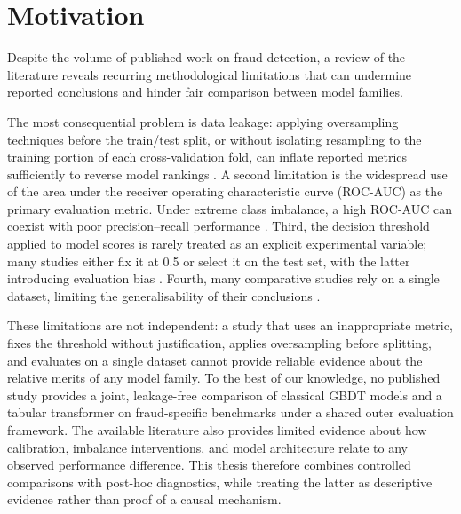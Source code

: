 \section{Motivation}
\label{subsec:motivation}

Despite the volume of published work on fraud detection, a review of the literature reveals recurring methodological limitations that can undermine reported conclusions and hinder fair comparison between model families.

The most consequential problem is data leakage: applying oversampling techniques before the train/test split, or without isolating resampling to the training portion of each cross-validation fold, can inflate reported metrics sufficiently to reverse model rankings \cite{hayat2025leakage}. A second limitation is the widespread use of the area under the receiver operating characteristic curve (ROC-AUC) as the primary evaluation metric. Under extreme class imbalance, a high ROC-AUC can coexist with poor precision--recall performance \cite{saito2015precision}. Third, the decision threshold applied to model scores is rarely treated as an explicit experimental variable; many studies either fix it at 0.5 or select it on the test set, with the latter introducing evaluation bias \cite{luzio2024decoupling}. Fourth, many comparative studies rely on a single dataset, limiting the generalisability of their conclusions \cite{dalpozzolo2017realistic}.

These limitations are not independent: a study that uses an inappropriate metric, fixes the threshold without justification, applies oversampling before splitting, and evaluates on a single dataset cannot provide reliable evidence about the relative merits of any model family. To the best of our knowledge, no published study provides a joint, leakage-free comparison of classical GBDT models and a tabular transformer on fraud-specific benchmarks under a shared outer evaluation framework. The available literature also provides limited evidence about how calibration, imbalance interventions, and model architecture relate to any observed performance difference. This thesis therefore combines controlled comparisons with post-hoc diagnostics, while treating the latter as descriptive evidence rather than proof of a causal mechanism.

